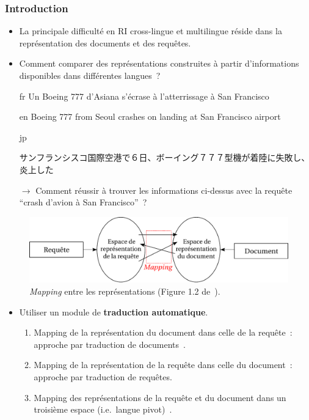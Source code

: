 \documentclass[12pt,aspectratio=43,dvipsnames,table]{beamer}
\begin{document}
\begin{frame}[allowframebreaks]
    \frametitle{Introduction}
    \begin{itemize} \itemsep10pt
        \item La principale difficulté en RI cross-lingue et multilingue réside 
              dans la représentation des documents et des requêtes.
        \item Comment comparer des représentations construites à partir 
              d'informations disponibles dans différentes langues~?
        \item[fr] {\small Un Boeing 777 d'Asiana s'écrase à l'atterrissage à
                  San Francisco}
                  \vspace*{-0.8em}
        \item[en] {\small Boeing 777 from Seoul crashes on landing at San 
                  Francisco airport}
                  \vspace*{-0.8em}
        \item[jp] {\small \begin{CJK}{UTF8}{min}サンフランシスコ国際空港で６日、ボーイング７７７型機が着陸に失敗し、炎上した\end{CJK}}
        \item[$\to$] Comment réussir à trouver les informations ci-dessus avec 
                     la requête ``crash d'avion à San Francisco''~?
    \end{itemize}

    \framebreak

    \begin{figure}
    \centering
    \includegraphics[width=1\textwidth]{img/mapping.pdf}
    \caption{\textit{Mapping} entre les représentations 
            (Figure 1.2 de~\cite{DBLP:series/synthesis/2010Nie}).}
    \end{figure}
    \vspace*{-1em}
    \begin{itemize}
        \item Utiliser un module de \textbf{traduction automatique}.
        \begin{enumerate} 
            \item Mapping de la représentation du document dans celle de la requête~: approche par traduction de documents~\cite{oard1997}.
            \item Mapping de la représentation de la requête dans celle du document~: approche par traduction de requêtes.
            \item Mapping des représentations de la requête et du document dans un troisième espace (i.e.~langue pivot)~\cite{ruiz1999,Kishida:2005}.
        \end{enumerate}
    \end{itemize}

\end{frame}
\end{document}
